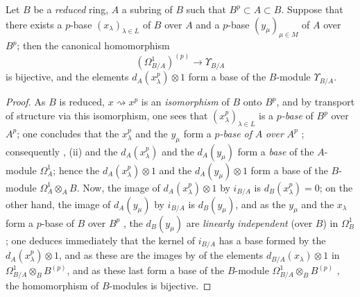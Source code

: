 \begin{proposition}[21.3.5]
\label{0.21.3.5}
Let $B$ be a \emph{reduced} ring, $A$ a subring of $B$ such that $B^p\subset A\subset B$.
Suppose that there exists a $p$-base $(x_\lambda)_{\lambda\in L}$ of $B$ over $A$ and a $p$-base $(y_\mu)_{\mu\in M}$ of $A$ over $B^p$; then the canonical homomorphism 
\begin{equation}
\tag{21.3.5.1}
  \label{0.21.3.5.1}
  (\Omega^1_{B/A})^{(p)}\to\Upsilon_{B/A}
\end{equation}
is bijective, and the elements $d_A(x^p_\lambda)\otimes 1$ form a base of the $B$-module $\Upsilon_{B/A}$.
\end{proposition}

\begin{proof}
As $B$ is reduced, $x\rightsquigarrow x^p$ is an \emph{isomorphism} of $B$ onto $B^p$, and by transport of structure via this isomorphism, one sees that $(x^p_\lambda)_{\lambda\in L}$ is a \emph{$p$-base} of $B^p$ over $A^p$; one concludes that the $x^p_\lambda$ and the $y_\mu$ form a \emph{$p$-base of} $A$ \emph{over} $A^p$ ; consequently , (ii) and  the $d_A(x^p_\lambda)$ and the $d_A(y_\mu)$ form a \emph{base} of the $A$-module $\Omega^1_A$; hence the $d_A(x^p_\lambda)\otimes 1$ and the $d_A(y_\mu)\otimes 1$ form a base of the $B$-module $\Omega^1_A\otimes_A B$.
Now, the image of $d_A(x^p_\lambda)\otimes 1$ by $i_{B/A}$ is $d_B(x^p_\lambda)=0$; on the other hand, the image of $d_A(y_\mu)$ by $i_{B/A}$ is $d_B(y_\mu)$, and as the $y_\mu$ and the $x_\lambda$ form a $p$-base of $B$ over $B^p$ , the $d_B(y_\mu)$ are \emph{linearly independent} (over $B$) in $\Omega^1_B$ ; one deduces immediately that the kernel of $i_{B/A}$ has a base formed by the $d_A(x^p_\lambda)\otimes 1$, and as these are the images by  of the elements $d_{B/A}(x_\lambda)\otimes 1$ in $\Omega^1_{B/A}\otimes_B B^{(p)}$, and as these last form a base of the $B$-module $\Omega^1_{B/A}\otimes_B B^{(p)}$ , the homomorphism  of $B$-modules is bijective.
\end{proof}


